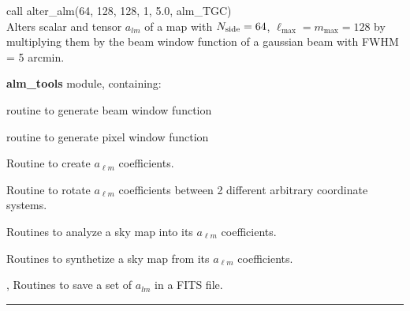 \begin{example}
{
call alter\_alm(64, 128, 128, 1, 5.0, alm\_TGC)  \\
}
{
Alters scalar and tensor $a_{lm}$ of a map with $N_\textrm{side}=64$, 
 $\ell_\textrm{max}=m_\textrm{max} = 128$ by multiplying them by the beam window function of a
gaussian beam with FWHM = 5 arcmin.
}
\end{example}

\begin{modules}
  \begin{sulist}{} %
  \item[\textbf{alm\_tools}] module, containing:
	\item[\htmlref{generate\_beam}{sub:generate_beam}] routine to generate beam window function
	\item[\htmlref{pixel\_window}{sub:pixel_window}] routine to generate pixel window function
  \end{sulist}
\end{modules}

\begin{related}
  \begin{sulist}{} %
  \item[\htmlref{create\_alm}{sub:create_alm}] Routine to create $a_{\ell m}$ coefficients.
  \item[\htmlref{rotate\_alm}{sub:rotate_alm}] Routine to rotate $a_{\ell m}$
  coefficients between 2 different arbitrary coordinate systems.
  \item[\htmlref{map2alm}{sub:map2alm}]  Routines to analyze a \healpix sky map into its $a_{\ell m}$
  coefficients.
  \item[\htmlref{alm2map}{sub:alm2map}] Routines to synthetize a \healpix sky map from its $a_{\ell m}$
  coefficients.
  \item[\htmlref{alms2fits}{sub:alms2fits}, \htmlref{dump\_alms}{sub:dump_alms}]
  Routines to save a set of $a_{lm}$ in a FITS file.  
  \end{sulist}
\end{related}

\rule{\hsize}{2mm}

\newpage
